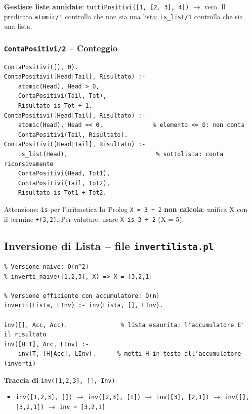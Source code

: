 \documentclass[12pt,a4paper]{article}
\begin{document}
\textbf{Gestisce liste annidate}: \texttt{tuttiPositivi([1, [2, 3], 4])} $\to$ vero.
Il predicato \texttt{atomic/1} controlla che non sia una lista; \texttt{is\_list/1}
controlla che sia una lista.

\subsubsection{\texttt{ContaPositivi/2} -- Conteggio}
\begin{lstlisting}
ContaPositivi([], 0).
ContaPositivi([Head|Tail], Risultato) :-
    atomic(Head), Head > 0,
    ContaPositivi(Tail, Tot),
    Risultato is Tot + 1.
ContaPositivi([Head|Tail], Risultato) :-
    atomic(Head), Head =< 0,              % elemento <= 0: non conta
    ContaPositivi(Tail, Risultato).
ContaPositivi([Head|Tail], Risultato) :-
    is_list(Head),                         % sottolista: conta ricorsivamente
    ContaPositivi(Head, Tot1),
    ContaPositivi(Tail, Tot2),
    Risultato is Tot1 + Tot2.
\end{lstlisting}

\begin{warnbox}{Attenzione: \texttt{is} per l'aritmetica}
In Prolog \texttt{X = 3 + 2} \textbf{non calcola}: unifica X con il termine
\texttt{+(3,2)}. Per valutare, usare \texttt{X is 3 + 2} (X = 5).
\end{warnbox}

\subsection{Inversione di Lista -- file \texttt{invertilista.pl}}

\begin{lstlisting}
% Versione naive: O(n^2)
% inverti_naive([1,2,3], X) => X = [3,2,1]

% Versione efficiente con accumulatore: O(n)
inverti(Lista, LInv) :- inv(Lista, [], LInv).

inv([], Acc, Acc).               % lista esaurita: l'accumulatore E' il risultato
inv([H|T], Acc, LInv) :-
    inv(T, [H|Acc], LInv).      % metti H in testa all'accumulatore (inverti)
\end{lstlisting}

\textbf{Traccia di} \texttt{inv([1,2,3], [], Inv)}:
\begin{itemize}[noitemsep]
  \item[] \texttt{inv([1,2,3], [])} $\to$ \texttt{inv([2,3], [1])} $\to$ \texttt{inv([3], [2,1])} $\to$ \texttt{inv([], [3,2,1])} $\to$ \texttt{Inv = [3,2,1]}
\end{itemize}
\end{document}
